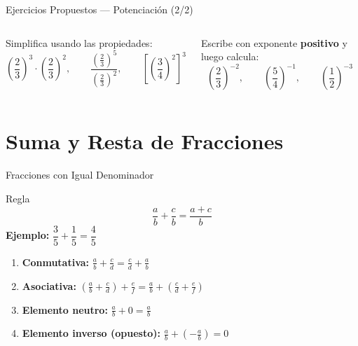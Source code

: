 \documentclass[aspectratio=169]{beamer}
\begin{document}
\begin{frame}{Ejercicios Propuestos — Potenciación \textnormal{(2/2)}}
  \begin{columns}[T]
    \begin{mwejercicio}
      Simplifica usando las propiedades:
      \[
        \left(\frac{2}{3}\right)^{3} \cdot
        \left(\frac{2}{3}\right)^{2},
        \qquad
        \frac{\left(\frac{2}{3}\right)^{5}}
             {\left(\frac{2}{3}\right)^{2}},
        \qquad
        \left[\left(\frac{3}{4}\right)^{2}\right]^{3}
      \]
    \end{mwejercicio}
    \begin{mwejercicio}
      Escribe con exponente \textbf{positivo} y luego calcula:
      \[
        \left(\frac{2}{3}\right)^{-2},
        \qquad
        \left(\frac{5}{4}\right)^{-1},
        \qquad
        \left(\frac{1}{2}\right)^{-3}
      \]
    \end{mwejercicio}
  \end{columns}
\end{frame}

\section{Suma y Resta de Fracciones}

\begin{frame}{Fracciones con Igual Denominador}
  \begin{block}{Regla}
    \[
      \frac{a}{b} + \frac{c}{b} = \frac{a + c}{b}
    \]
    \textbf{Ejemplo:}\quad
    $\dfrac{3}{5} + \dfrac{1}{5} = \dfrac{4}{5}$
  \end{block}
  \vspace{4pt}
  \begin{mwextra}
    \begin{enumerate}
      \item \textbf{Conmutativa:} $\frac{a}{b} + \frac{c}{d}
            = \frac{c}{d} + \frac{a}{b}$
      \item \textbf{Asociativa:} $\left(\frac{a}{b} +
            \frac{c}{d}\right) + \frac{e}{f}
            = \frac{a}{b} + \left(\frac{c}{d} + \frac{e}{f}\right)$
      \item \textbf{Elemento neutro:} $\frac{a}{b} + 0 = \frac{a}{b}$
      \item \textbf{Elemento inverso (opuesto):}
            $\frac{a}{b} + \left(-\frac{a}{b}\right) = 0$
    \end{enumerate}
  \end{mwextra}
\end{frame}
\end{document}
